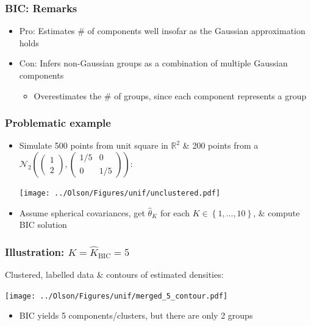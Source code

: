 \documentclass[mathserif,compress]{beamer}
\newcommand*\reals{\mathbb{R}}
\newcommand*\set[1]{\left\{#1\right\}}
\newcommand*\estim[1]{\widehat{#1}}
\renewcommand\;{\,}
\begin{document}
\begin{frame}\frametitle{BIC: Remarks}
\begin{itemize}
\item[]
\alert{Pro:} Estimates \# of components well insofar as the Gaussian approximation holds
\bigskip
\item[]
\alert{Con:} Infers non-Gaussian groups as a combination of multiple Gaussian components
\begin{itemize}
\bigskip
\item
Overestimates the \# of groups, since each component represents a group
\end{itemize}
\end{itemize}

\end{frame}

\begin{frame}\frametitle{Problematic example}
\begin{itemize}
\item[]
Simulate 500 points from unit square in $\reals^2$ \& 200 points from a 
$\mathcal N_2\left(\begin{pmatrix} 1 \\ 2 \end{pmatrix},
	\begin{pmatrix} 1/5 & 0 \\ 0 & 1/5 \end{pmatrix}\right)$:
\begin{center}
\texttt{[image: ../Olson/Figures/unif/unclustered.pdf]}
\end{center}
\item[]
Assume spherical covariances, get $\estim\theta_K$  for each $K \in \set{1, \dotsc, 10}$, \& compute BIC solution
\end{itemize}
\end{frame}

\begin{frame}\frametitle{Illustration: $K = \estim K_\text{BIC} = 5$}
Clustered, labelled data \& contours of estimated densities:
\begin{center}
\texttt{[image: ../Olson/Figures/unif/merged\_5\_contour.pdf]}
\end{center}
\begin{itemize}
\item
BIC yields 5 components/clusters, but there are only 2 groups
\end{itemize}
\end{frame}
\end{document}
